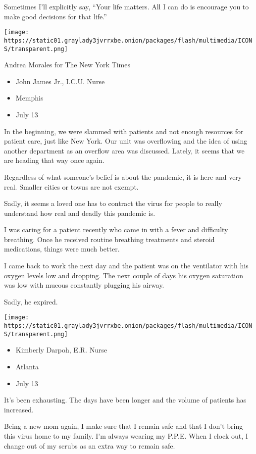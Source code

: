 Sometimes I'll explicitly say, ``Your life matters. All I can do is
encourage you to make good decisions for that life.''

\texttt{[image: https://static01.graylady3jvrrxbe.onion/packages/flash/multimedia/ICONS/transparent.png]}

Andrea Morales for The New York Times

\begin{itemize}
\tightlist
\item
  John James Jr., I.C.U. Nurse
\item
  Memphis
\item
  July 13
\end{itemize}

In the beginning, we were slammed with patients and not enough resources
for patient care, just like New York. Our unit was overflowing and the
idea of using another department as an overflow area was discussed.
Lately, it seems that we are heading that way once again.

Regardless of what someone's belief is about the pandemic, it is here
and very real. Smaller cities or towns are not exempt.

Sadly, it seems a loved one has to contract the virus for people to
really understand how real and deadly this pandemic is.

I was caring for a patient recently who came in with a fever and
difficulty breathing. Once he received routine breathing treatments and
steroid medications, things were much better.

I came back to work the next day and the patient was on the ventilator
with his oxygen levels low and dropping. The next couple of days his
oxygen saturation was low with mucous constantly plugging his airway.

Sadly, he expired.

\texttt{[image: https://static01.graylady3jvrrxbe.onion/packages/flash/multimedia/ICONS/transparent.png]}

\begin{itemize}
\tightlist
\item
  Kimberly Darpoh, E.R. Nurse
\item
  Atlanta
\item
  July 13
\end{itemize}

It's been exhausting. The days have been longer and the volume of
patients has increased.

Being a new mom again, I make sure that I remain safe and that I don't
bring this virus home to my family. I'm always wearing my P.P.E. When I
clock out, I change out of my scrubs as an extra way to remain safe.

